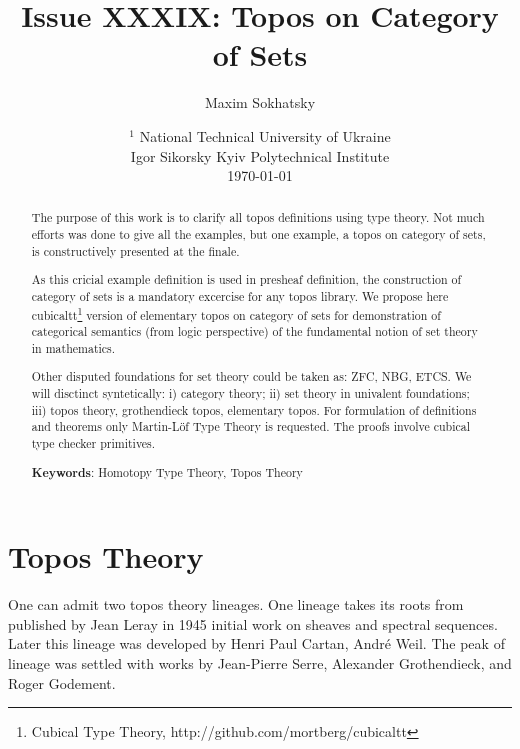 \documentclass{article}
\theoremstyle{definition}
\begin{document}
\title{Issue XXXIX: Topos on Category of Sets}
\author{Maxim Sokhatsky}
\date{ $^1$ National Technical University of Ukraine \\
       \small Igor Sikorsky Kyiv Polytechnical Institute\\
       \today }

\maketitle

\begin{abstract}

The purpose of this work is to clarify all topos definitions using type theory.
Not much efforts was done to give all the examples, but one example, a topos
on category of sets, is constructively presented at the finale.

As this cricial example definition is used in presheaf definition,
the construction of category of sets is a mandatory excercise for any topos library.
We propose here cubicaltt\footnote{Cubical Type Theory, http://github.com/mortberg/cubicaltt}
version of elementary topos on category of sets for demonstration of categorical
semantics (from logic perspective) of the fundamental notion of set theory in mathematics.

Other disputed foundations for set theory could be taken as:
ZFC, NBG, ETCS. We will disctinct syntetically: i) category theory;
ii) set theory in univalent foundations; iii) topos theory, grothendieck topos,
elementary topos. For formulation of definitions and theorems only Martin-Löf
Type Theory is requested. The proofs involve cubical type checker primitives.

{\bf Keywords}: Homotopy Type Theory, Topos Theory
\end{abstract}


\ifincludeTOC
  \tableofcontents
\fi

\newpage

\section{Topos Theory}

One can admit two topos theory lineages. One lineage takes its roots from published
by Jean Leray in 1945 initial work on sheaves and spectral sequences. Later this lineage
was developed by Henri Paul Cartan, André Weil. The peak of lineage was settled
with works by Jean-Pierre Serre, Alexander Grothendieck, and Roger Godement.
\end{document}
